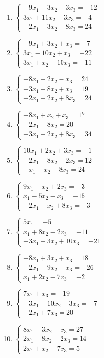 \begin{enumerate}[label=\arabic*., leftmargin=*]
\item $\begin{cases}-9x_1-3x_2-3x_3=-12\\3x_1+11x_2-3x_3=-4\\-2x_1-3x_2-8x_3=24\end{cases}$
\item $\begin{cases}-9x_1+3x_2+x_3=-7\\3x_1-10x_2+x_3=-22\\3x_1+x_2-10x_3=-11\end{cases}$
\item $\begin{cases}-8x_1-2x_2-x_3=24\\-3x_1-8x_2+x_3=19\\-2x_1-2x_2+8x_3=24\end{cases}$
\item $\begin{cases}-8x_1+x_2+x_3=17\\-2x_1-8x_2=20\\-3x_1-2x_2+8x_3=34\end{cases}$
\item $\begin{cases}10x_1+2x_2+3x_3=-1\\-2x_1-8x_2-2x_3=12\\-x_1-x_2-8x_3=24\end{cases}$
\item $\begin{cases}9x_1-x_2+2x_3=-3\\x_1-5x_2-x_3=-15\\-2x_1-x_2+8x_3=-3\end{cases}$
\item $\begin{cases}5x_1=-5\\x_1+8x_2-2x_3=-11\\-3x_1-3x_2+10x_3=-21\end{cases}$
\item $\begin{cases}-8x_1+3x_2+x_3=18\\-2x_1-9x_2-x_3=-26\\x_1+2x_2-7x_3=-2\end{cases}$
\item $\begin{cases}7x_1+x_3=-19\\-3x_1-10x_2-3x_3=-7\\-2x_1+7x_3=20\end{cases}$
\item $\begin{cases}8x_1-3x_2-x_3=27\\2x_1-8x_2-2x_3=14\\2x_1+x_2-7x_3=5\end{cases}$

\end{enumerate}
